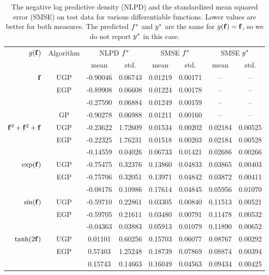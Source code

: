 \documentclass{article} %
\begin{document}
\begin{table}[tb]
    \centering
    \caption[]
    {%
       The negative log predictive density (NLPD) and the standardized 
       mean squared error (SMSE) on test data for various differentiable functions. 
       Lower values are better for both measures. 
        The predicted $f^{*}$ and 
        $y^{*}$ are the same for $g\!\left({{\mathbf{f}}}\right) = \mathbf{f}$, so we do
        not report $y^{*}$ in this case.}
    \footnotesize
    \begin{tabular}{r|c| c c c c c c}
        \multirow{2}{*}{$g\!\left({{\mathbf{f}}}\right)$} & \multirow{2}{*}{Algorithm} & 
            \multicolumn{2}{c}{NLPD $f^{*}$} &
            \multicolumn{2}{c}{SMSE $f^{*}$} &
            \multicolumn{2}{c}{SMSE $y^{*}$} \\
        & & mean & std. & mean & std. & mean & std.\\
        \toprule
        $\mathbf{f}$ 
& UGP & -0.90046 & 0.06743 & 0.01219 & 0.00171 & -- & -- \\
& EGP & -0.89908 & 0.06608 & 0.01224 & 0.00178 & -- & -- \\
& \cite{Opper2009} & -0.27590 & 0.06884 & 0.01249 & 0.00159 & -- & -- \\
& GP & -0.90278 & 0.06988 & 0.01211 & 0.00160 & -- & -- \\
        \midrule
        $\mathbf{f}^3 + \mathbf{f}^2 + \mathbf{f}$ 
& UGP & -0.23622 & 1.72609 & 0.01534 & 0.00202 & 0.02184 & 0.00525 \\
& EGP & -0.22325 & 1.76231 & 0.01518 & 0.00203 & 0.02184 & 0.00528 \\
& \cite{Opper2009} & -0.14559 & 0.04026 & 0.06733 & 0.01421 & 0.02686 & 0.00266 \\
        \midrule
        $\exp\!\left({\mathbf{f}}\right)$ 
& UGP & -0.75475 & 0.32376 & 0.13860 & 0.04833 & 0.03865 & 0.00403 \\
& EGP & -0.75706 & 0.32051 & 0.13971 & 0.04842 & 0.03872 & 0.00411 \\
& \cite{Opper2009} & -0.08176 & 0.10986 & 0.17614 & 0.04845 & 0.05956 & 0.01070 \\
        \midrule
        $\sin\!\left({\mathbf{f}}\right)$ 
& UGP & -0.59710 & 0.22861 & 0.03305 & 0.00840 & 0.11513 & 0.00521 \\
& EGP & -0.59705 & 0.21611 & 0.03480 & 0.00791 & 0.11478 & 0.00532 \\
& \cite{Opper2009} & -0.04363 & 0.03883 & 0.05913 & 0.01079 & 0.11890 & 0.00652 \\
        \midrule
        $\tanh\!\left({2\mathbf{f}}\right)$
& UGP & 0.01101 & 0.60256 & 0.15703 & 0.06077 & 0.08767 & 0.00292 \\
& EGP & 0.57403 & 1.25248 & 0.18739 & 0.07869 & 0.08874 & 0.00394 \\
& \cite{Opper2009} & 0.15743 & 0.14663 & 0.16049 & 0.04563 & 0.09434 & 0.00425 \\
        \bottomrule
    \end{tabular}
    \label{tab:toy}
\end{table}
\end{document}
